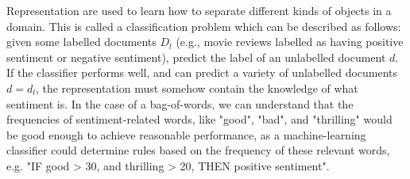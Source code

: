 Representation are  used to learn how to separate different kinds of objects in a domain. This is called a classification problem which can be described as follows: given some labelled documents $D_l$ (e.g., movie reviews labelled as having positive sentiment or negative sentiment), predict the label of an unlabelled document $d$. If the classifier performs well, and can predict a variety of unlabelled documents $d = d_l$, the representation must somehow contain the knowledge of what sentiment is. In the case of a bag-of-words, we can understand that the frequencies of sentiment-related words, like "good", "bad", and "thrilling" would be good enough to achieve reasonable performance, as a machine-learning classifier could determine rules based on the frequency of these relevant words, e.g. "IF good > 30, and thrilling > 20, THEN positive sentiment".






